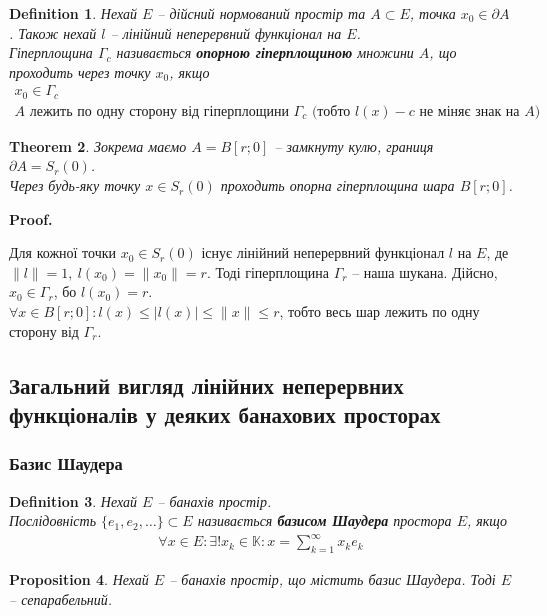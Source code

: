 \documentclass[a4paper, 10pt]{article}
\makeatletter
\theoremstyle{theoremdd}
\newtheorem{theorem}{Theorem}[subsection]
\theoremstyle{theoremdd}
\newtheorem{definition}[theorem]{Definition}
\theoremstyle{theoremdd}
\theoremstyle{theoremdd}
\theoremstyle{theoremdd}
\newtheorem{proposition}[theorem]{Proposition}
\theoremstyle{theoremdd}
\theoremstyle{theoremdd}
\theoremstyle{theoremdd}
\renewenvironment{proof}[1][Proof.\\]{\par
\pushQED{\hfill \qed}%
\normalfont \topsep6\p@\@plus6\p@\relax
\trivlist
\item\relax
{\bfseries
#1\@addpunct{.}}\hspace\labelsep\ignorespaces
}{%
\popQED\endtrivlist\@endpefalse
}
\makeatother
\begin{document}
\begin{definition}
Нехай $E$ -- дійсний нормований простір та $A \subset E$, точка $x_0 \in \partial A$. Також нехай $l$ -- лінійний неперервний функціонал на $E$.\\
Гіперплощина $\Gamma_c$ називається \textbf{опорною гіперплощиною} множини $A$, що проходить через точку $x_0$, якщо
\begin{align*}
x_0 \in \Gamma_c \\
A \text{ лежить по одну сторону від гіперплощини } \Gamma_c \text{ (тобто $l(x) - c$ не міняє знак на $A$)}
\end{align*}
\end{definition}

\begin{theorem}
Зокрема маємо $A = B[r;0]$ -- замкнуту кулю, границя $\partial A = S_r(0)$.\\
Через будь-яку точку $x \in S_r(0)$ проходить опорна гіперплощина шара $B[r;0]$.
\end{theorem}

\begin{proof}
Для кожної точки $x_0 \in S_r(0)$ існує лінійний неперервний функціонал $l$ на $E$, де $\|l\| = 1,\ l(x_0) = \|x_0\| = r$. Тоді гіперплощина $\Gamma_r$ -- наша шукана. Дійсно, $x_0 \in \Gamma_r$, бо $l(x_0) = r$.\\
$\forall x \in B[r;0]: l(x) \leq |l(x)| \leq \|x\| \leq r$, тобто весь шар лежить по одну сторону від $\Gamma_r$.
\end{proof}

\subsection{Загальний вигляд лінійних неперервних функціоналів у деяких банахових просторах}
\subsubsection{Базис Шаудера}
\begin{definition}
Нехай $E$ -- банахів простір.\\
Послідовність $\{e_1,e_2,\dots\} \subset E$ називається \textbf{базисом Шаудера} простора $E$, якщо
\begin{align*}
\forall x \in E: \exists ! x_k \in \mathbb{K}: x = \displaystyle\sum_{k=1}^\infty x_k e_k
\end{align*}
\end{definition}

\begin{proposition}
Нехай $E$ -- банахів простір, що містить базис Шаудера. Тоді $E$ -- сепарабельний.
\end{proposition}
\end{document}
